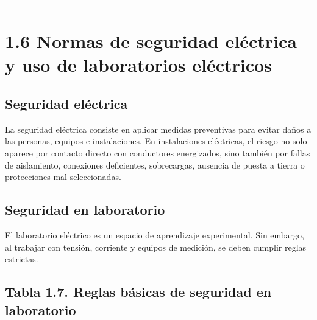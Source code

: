 \documentclass[
  spanish,
  letterpaper,
  DIV=11,
  numbers=noendperiod]{scrreprt}
\begin{document}
\begin{center}\rule{0.5\linewidth}{0.5pt}\end{center}

\section{1.6 Normas de seguridad eléctrica y uso de laboratorios
eléctricos}\label{normas-de-seguridad-eluxe9ctrica-y-uso-de-laboratorios-eluxe9ctricos}

\subsection{Seguridad eléctrica}\label{seguridad-eluxe9ctrica}

La seguridad eléctrica consiste en aplicar medidas preventivas para
evitar daños a las personas, equipos e instalaciones. En instalaciones
eléctricas, el riesgo no solo aparece por contacto directo con
conductores energizados, sino también por fallas de aislamiento,
conexiones deficientes, sobrecargas, ausencia de puesta a tierra o
protecciones mal seleccionadas.

\subsection{Seguridad en laboratorio}\label{seguridad-en-laboratorio}

El laboratorio eléctrico es un espacio de aprendizaje experimental. Sin
embargo, al trabajar con tensión, corriente y equipos de medición, se
deben cumplir reglas estrictas.

\subsection{Tabla 1.7. Reglas básicas de seguridad en
laboratorio}\label{tabla-1.7.-reglas-buxe1sicas-de-seguridad-en-laboratorio}
\end{document}
